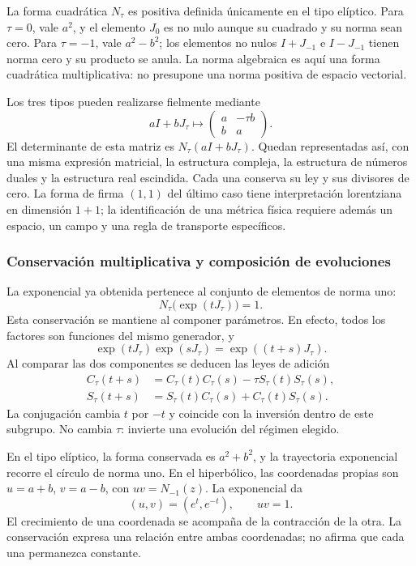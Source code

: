 La forma cuadrática \(N_\tau\) es positiva definida únicamente en el tipo elíptico.
Para \(\tau=0\), vale \(a^2\), y el elemento \(J_0\) es no nulo aunque su
cuadrado y su norma sean cero. Para \(\tau=-1\), vale \(a^2-b^2\); los
elementos no nulos \(I+J_{-1}\) e \(I-J_{-1}\) tienen norma cero y su
producto se anula. La norma algebraica es aquí una forma cuadrática
multiplicativa: no presupone una norma positiva de espacio vectorial.

Los tres tipos pueden realizarse fielmente mediante
\[
 aI+bJ_\tau\longmapsto
 \begin{pmatrix}a&-\tau b\\b&a\end{pmatrix}.
\]
El determinante de esta matriz es \(N_\tau(aI+bJ_\tau)\). Quedan
representadas así, con una misma expresión matricial, la estructura
compleja, la estructura de números duales y la estructura real escindida.
Cada una conserva su ley y sus divisores de cero. La forma de firma
\((1,1)\) del último caso tiene interpretación lorentziana en dimensión
\(1+1\); la identificación de una métrica física requiere además un espacio,
un campo y una regla de transporte específicos.

\subsubsection{Conservación multiplicativa y composición de evoluciones}
\label{x_reciprocidad:trit-ampl-evoluciones}

La exponencial ya obtenida pertenece al conjunto de elementos de norma uno:
\[
 N_\tau\bigl(\exp(tJ_\tau)\bigr)=1.
\]
Esta conservación se mantiene al componer parámetros. En efecto, todos los
factores son funciones del mismo generador, y
\[
 \exp(tJ_\tau)\exp(sJ_\tau)=\exp((t+s)J_\tau).
\]
Al comparar las dos componentes se deducen las leyes de adición
\begin{align}
 C_\tau(t+s)&=C_\tau(t)C_\tau(s)-\tau S_\tau(t)S_\tau(s),\\
 S_\tau(t+s)&=S_\tau(t)C_\tau(s)+C_\tau(t)S_\tau(s).
\end{align}
La conjugación cambia \(t\) por \(-t\) y coincide con la inversión dentro
de este subgrupo. No cambia \(\tau\): invierte una evolución del régimen
elegido.

En el tipo elíptico, la forma conservada es \(a^2+b^2\), y la trayectoria
exponencial recorre el círculo de norma uno. En el hiperbólico, las
coordenadas propias son \(u=a+b\), \(v=a-b\), con \(uv=N_{-1}(z)\).
La exponencial da
\[
 (u,v)=(e^t,e^{-t}),\qquad uv=1.
\]
El crecimiento de una coordenada se acompaña de la contracción de la otra.
La conservación expresa una relación entre ambas coordenadas; no afirma que
cada una permanezca constante.

